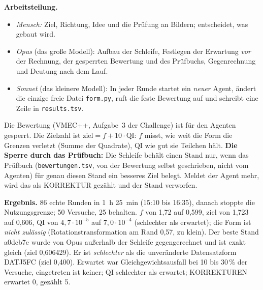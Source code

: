 \textbf{Arbeitsteilung.}
\begin{itemize}\itemsep1pt
\item \emph{Mensch:} Ziel, Richtung, Idee und die Prüfung an Bildern; entscheidet, was gebaut wird.
\item \emph{Opus} (das große Modell): Aufbau der Schleife, Festlegen der Erwartung \emph{vor} der Rechnung, der gesperrten Bewertung und des Prüfbuchs, Gegenrechnung und Deutung nach dem Lauf.
\item \emph{Sonnet} (das kleinere Modell): In jeder Runde startet ein \emph{neuer} Agent, ändert die einzige freie Datei \texttt{form.py}, ruft die feste Bewertung auf und schreibt eine Zeile in \texttt{results.tsv}.
\end{itemize}
Die Bewertung (VMEC++, Aufgabe~3 der Challenge) ist für den Agenten gesperrt. Die Zielzahl ist $\text{ziel}=f+10\cdot\mathrm{QI}$: $f$ misst, wie weit die Form die Grenzen verletzt (Summe der Quadrate), QI wie gut sie Teilchen hält. \textbf{Die Sperre durch das Prüfbuch:} Die Schleife behält einen Stand nur, wenn das Prüfbuch
(\texttt{bewertungen.tsv}, von der Bewertung selbst geschrieben, nicht vom Agenten) für genau diesen Stand ein besseres Ziel belegt. Meldet der Agent mehr, wird das als KORREKTUR gezählt und der Stand verworfen.

\textbf{Ergebnis.} 86 echte Runden in 1~h 25~min (15:10 bis 16:35), danach stoppte die Nutzungsgrenze; 50 Versuche, 25 behalten. $f$ von 1,72 auf 0,599, ziel von 1,723 auf 0,606, QI von $4{,}7\cdot10^{-5}$ auf $7{,}0\cdot10^{-4}$ (schlechter als erwartet); die Form ist \emph{nicht zulässig} (Rotationstransformation am Rand 0,57, zu klein). Der beste Stand
a0dcb7e wurde von Opus außerhalb der Schleife gegengerechnet und ist exakt gleich (ziel 0,606429). Er ist \emph{schlechter} als die unveränderte Datensatzform DATJ5FC (ziel 0,400). Erwartet war Gleichgewichtsausfall bei 10 bis 30\,\% der Versuche, eingetreten ist keiner; QI schlechter als erwartet; KORREKTUREN erwartet 0, gezählt 5.


